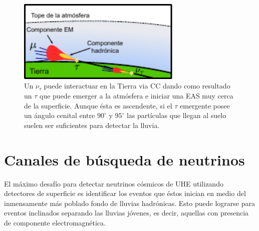 \begin{figure}[ht]
\begin{center}
\includegraphics[width=0.7\textwidth]{fig/EASAuger/horizontal_es_english.pdf}
\caption{Un $\nu_{\tau}$ puede interactuar en la Tierra via CC dando como resultado un $\tau$ que puede emerger a la atmósfera e iniciar una EAS muy cerca de la superficie.
Aunque \'esta es ascendente, si el $\tau$ emergente posee un ángulo cenital entre $90^\circ$ y $95^\circ$ las partículas que llegan al suelo suelen ser suficientes para detectar la lluvia.}
\label{fig:esNu}
\end{center}
\end{figure}


\section{Canales de búsqueda de neutrinos}

El m\'aximo desafío para detectar neutrinos cósmicos de UHE utilizando detectores de superficie es identificar los eventos que éstos inician en medio del inmensamente más poblado fondo de lluvias hadrónicas. Esto puede lograrse para eventos inclinados separando las lluvias jóvenes, es decir, aquellas con presencia de componente electromagn\'etica.

